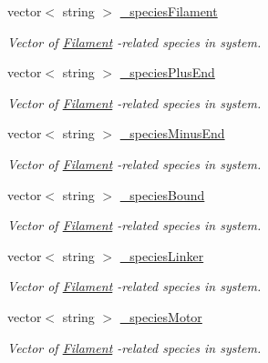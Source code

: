 \begin{DoxyCompactItemize}
\item 
vector$<$ string $>$ \hyperlink{classSimpleManagerImpl_a6842452647356333fa3a8dfc9daad925}{\+\_\+species\+Filament}
\begin{DoxyCompactList}\small\item\em Vector of \hyperlink{classFilament}{Filament} -\/related species in system. \end{DoxyCompactList}\item 
vector$<$ string $>$ \hyperlink{classSimpleManagerImpl_a8c41d3d46a0534a7127d5b863718bcba}{\+\_\+species\+Plus\+End}
\begin{DoxyCompactList}\small\item\em Vector of \hyperlink{classFilament}{Filament} -\/related species in system. \end{DoxyCompactList}\item 
vector$<$ string $>$ \hyperlink{classSimpleManagerImpl_a07794aeec638f61758d22f7ba3b2d5b4}{\+\_\+species\+Minus\+End}
\begin{DoxyCompactList}\small\item\em Vector of \hyperlink{classFilament}{Filament} -\/related species in system. \end{DoxyCompactList}\item 
vector$<$ string $>$ \hyperlink{classSimpleManagerImpl_ad09569aff7c98442037cd4b5e5fd1d4d}{\+\_\+species\+Bound}
\begin{DoxyCompactList}\small\item\em Vector of \hyperlink{classFilament}{Filament} -\/related species in system. \end{DoxyCompactList}\item 
vector$<$ string $>$ \hyperlink{classSimpleManagerImpl_ac5bb2d96109696dcd63109154f88c6be}{\+\_\+species\+Linker}
\begin{DoxyCompactList}\small\item\em Vector of \hyperlink{classFilament}{Filament} -\/related species in system. \end{DoxyCompactList}\item 
vector$<$ string $>$ \hyperlink{classSimpleManagerImpl_a5ff19b12a756eaba341d179b795ed6b4}{\+\_\+species\+Motor}
\begin{DoxyCompactList}\small\item\em Vector of \hyperlink{classFilament}{Filament} -\/related species in system. \end{DoxyCompactList}\end{DoxyCompactItemize}



